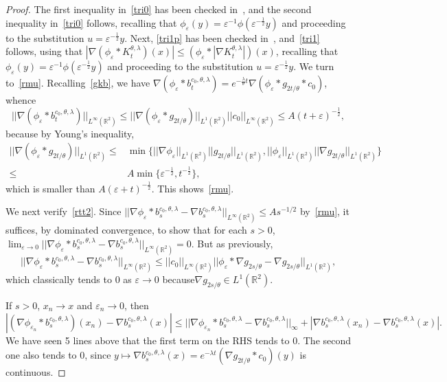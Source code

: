 \documentclass[11pt]{article}
\newcommand{\R}{\mathbb{R}}
\newcommand{\1}{\mathbbm{1}}
\newcommand{\e}{\varepsilon}
\newcommand{\vip}{\vskip5pt}
\begin{document}
\begin{proof} 
The first inequality in~\eqref{tri0} has been checked in~\cite[proof of Theorem~14, Step~1]{FT1}, and the second inequality in~\eqref{tri0} follows, recalling that  
$\phi_\e(y)=\e^{-1}\phi(\e^{-\frac12}y)$
and proceeding to the substitution $u=\e^{-\frac12}y$.
Next, \eqref{tri1p} has been checked in~\cite[Remark~9]{FT1},
and~\eqref{tri1} follows, using that 
$|\nabla (\phi_\e \ast K^{\theta,\lambda}_t)(x)|\leq (\phi_\e\ast |\nabla K^{\theta,\lambda}_t|)(x)$,  recalling that $\phi_\e(y)=\e^{-1}\phi(\e^{-\frac12}y)$
and proceeding to the substitution $u=\e^{-\frac12}y$.
\vip
We turn to~\eqref{rmu}. Recalling~\eqref{gkb}, we have
$\nabla (\phi_{\e}\ast b^{c_0,\theta,\lambda}_t) = e^{-\frac\lambda\theta t}
\nabla (\phi_\e \ast g_{2t/\theta}\ast c_0)$, whence
$$
||\nabla (\phi_{\e}\ast b^{c_0,\theta,\lambda}_t)||_{L^\infty(\R^2)}\leq ||\nabla (\phi_\e \ast g_{2t/\theta})||_{L^1(\R^2)}
||c_0||_{L^\infty(\R^2)} \leq A (t+\e)^{-\frac 12},
$$
because by Young's inequality,
\begin{align*}
||\nabla (\phi_\e \ast g_{2t/\theta})||_{L^1(\R^2)}\leq &
\min\Big\{||\nabla \phi_\e||_{L^1(\R^2)} ||g_{2t/\theta}||_{L^1(\R^2)},||\phi_\e||_{L^1(\R^2)} 
||\nabla g_{2t/\theta}||_{L^1(\R^2)}\Big\} \\
\leq& A \min\{\e^{-\frac12},t^{-\frac12}\},
\end{align*}
which is smaller than $A(\e+t)^{-\frac 12}$. This shows~\eqref{rmu}. 

\vip
We next verify~\eqref{rtt2}. Since 
$||\nabla \phi_{\e}\ast b^{c_0,\theta,\lambda}_s-\nabla b^{c_0,\theta,\lambda}_s ||_{L^\infty(\R^2)}\leq A s^{-1/2}$ 
by~\eqref{rmu}, it suffices, by dominated convergence, to show that for each $s>0$,
$\lim_{\e\to 0}||\nabla \phi_{\e}\ast b^{c_0,\theta,\lambda}_s-\nabla b^{c_0,\theta,\lambda}_s ||_{L^\infty(\R^2)}=0$.
But as previously,
$$
||\nabla \phi_{\e}\ast b^{c_0,\theta,\lambda}_s-\nabla b^{c_0,\theta,\lambda}_s ||_{L^\infty(\R^2)}
\leq ||c_0||_{L^\infty(\R^2)}  ||\phi_\e\ast \nabla g_{2s/\theta}-\nabla g_{2s/\theta}||_{L^1(\R^2)},
$$
which classically tends to $0$ as $\e\to 0$ because$\nabla g_{2s/\theta}\in L^1(\R^2)$.
\vip

If $s>0$, $x_n\to x$ and $\e_n\to 0$, then
$$
|(\nabla \phi_{\e_n}\ast b^{c_0,\theta,\lambda}_{s})(x_n)- \nabla b^{c_0,\theta,\lambda}_{s}(x)|\leq
||\nabla \phi_{\e_n}\ast b^{c_0,\theta,\lambda}_{s}- \nabla b^{c_0,\theta,\lambda}_{s}||_\infty+
|\nabla b^{c_0,\theta,\lambda}_{s}(x_n)-\nabla b^{c_0,\theta,\lambda}_{s}(x)|.
$$
We have seen 5 lines above that the first term on the RHS tends to $0$. The second one also tends to $0$,
since $y\mapsto \nabla b^{c_0,\theta,\lambda}_s (x)= e^{-\lambda t} (\nabla g_{2t/\theta}\ast c_0)(y)$ is continuous. 
\end{proof}


\small

\end{document}
